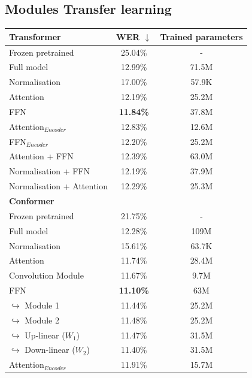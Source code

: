 \subsection{Modules Transfer learning}
\begin{table}
    \begin{center}
        \begin{tabular}{lcc}\hline
            \textbf{Transformer}    & WER  $\downarrow$   & Trained parameters \\ \hline
            Frozen pretrained & 25.04\% & -   \\
            Full model   & 12.99\% & 71.5M   \\ \hline
            Normalisation & 17.00\% & 57.9K  \\
            Attention & 12.19\% & 25.2M  \\
            FFN    & \textbf{11.84\%}     &  37.8M \\ \hline
            Attention$_{Encoder}$ & 12.83\% & 12.6M \\ 
            FFN$_{Encoder}$ & 12.20\% & 25.2M \\ \hline 
            Attention + FFN & 12.39\% & 63.0M \\
            Normalisation + FFN & 12.19\% & 37.9M \\
            Normalisation + Attention & 12.29\% & 25.3M\\ \hline \hline
            \textbf{Conformer}    &     & \\ \hline
            Frozen pretrained & 21.75\% & -   \\
            Full model   & 12.28\% & 109M   \\ \hline
            Normalisation & 15.61\% & 63.7K  \\
            Attention & 11.74\% & 28.4M  \\
            Convolution Module & 11.67\% & 9.7M \\
            FFN    & \textbf{11.10\%}     &  63M \\
            \quad $\hookrightarrow$ Module 1    & 11.44\%     &  25.2M \\
            \quad $\hookrightarrow$ Module 2    & 11.48\%     &  25.2M \\
            \quad $\hookrightarrow$ Up-linear ($W_1$)    & 11.47\%     &  31.5M \\
            \quad $\hookrightarrow$ Down-linear ($W_2$)    & 11.40\%     &  31.5M \\ \hline
            Attention$_{Encoder}$ & 11.91\% & 15.7M \\ 

\end{tabular}
\end{center}
\end{table}

